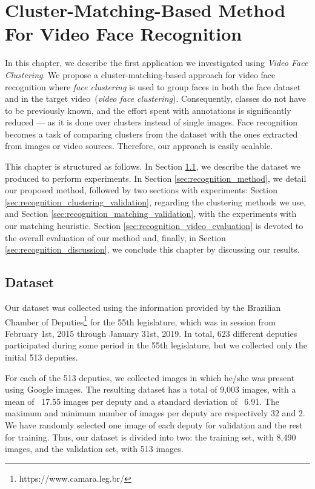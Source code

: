 \newpage
\chapter{Cluster-Matching-Based Method For Video Face Recognition}
\label{chap:face_recognition}

In this chapter, we describe the first application we investigated using \emph{Video Face Clustering}.
We propose a cluster-matching-based approach for video face recognition where \emph{face clustering} is used to group faces in both the face dataset and in the target video~(\emph{video face clustering}).
Consequently, classes do not have to be previously known, and the effort spent with annotations is significantly reduced --- as it is done over clusters instead of single images.
Face recognition becomes a task of comparing clusters from the dataset with the ones extracted from images or video sources.
Therefore, our approach is easily scalable.

This chapter is structured as follows. 
In Section \ref{sec:recognition_dataset}, we describe the dataset we produced to perform experiments. 
In Section \ref{sec:recognition_method}, we detail our proposed method, followed by two sections with experiments: 
Section \ref{sec:recognition_clustering_validation}, regarding the clustering methods we use, and 
Section \ref{sec:recognition_matching_validation}, with the experiments with our matching heuristic.
Section \ref{sec:recognition_video_evaluation} is devoted to the overall evaluation of our method and, finally, 
in Section \ref{sec:recognition_discussion}, we conclude this chapter by discussing our results.

\section{Dataset}
\label{sec:recognition_dataset}
Our dataset was collected using the information provided by the Brazilian Chamber of Deputies\footnote{https://www.camara.leg.br/} for the 55th legislature, which was in session from February 1st, 2015 through January 31st, 2019.
In total, 623 different deputies participated during some period in the 55th legislature, but we collected only the initial 513 deputies.

For each of the 513 deputies, we collected images in which he/she was present using Google images.
The resulting dataset has a total of 9,003 images, with a mean of ~17.55 images per deputy and a standard deviation of ~6.91. 
The maximum and minimum number of images per deputy are respectively 32 and 2.
We have randomly selected one image of each deputy for validation and the rest for training.
Thus, our dataset is divided into two: the training set, with 8,490 images, and the validation set, with 513 images.  

